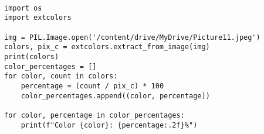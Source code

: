 
\begin{verbatim}

import os
import extcolors

img = PIL.Image.open('/content/drive/MyDrive/Picture11.jpeg')
colors, pix_c = extcolors.extract_from_image(img)
print(colors)
color_percentages = []
for color, count in colors:
    percentage = (count / pix_c) * 100
    color_percentages.append((color, percentage))

for color, percentage in color_percentages:
    print(f"Color {color}: {percentage:.2f}%")

\end{verbatim}